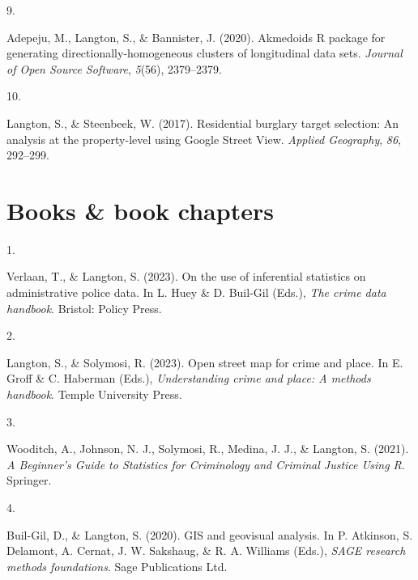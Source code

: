 \documentclass[10pt,a4paper,]{article}
\newlength{\cslhangindent}
\newlength{\csllabelwidth}
\newenvironment{CSLReferences}[2] %
 {\begin{list}{}{%
  \setlength{\itemindent}{0pt}
  \setlength{\leftmargin}{0pt}
  \setlength{\parsep}{0pt}
  \ifodd #1
   \setlength{\leftmargin}{\cslhangindent}
   \setlength{\itemindent}{-1\cslhangindent}
  \fi
  \setlength{\itemsep}{#2\baselineskip}}}
 {\end{list}}
\newcommand{\CSLLeftMargin}[1]{\parbox[t]{\csllabelwidth}{\strut#1\strut}}
\newcommand{\CSLRightInline}[1]{\parbox[t]{\linewidth - \csllabelwidth}{\strut#1\strut}}
\begin{document}
\begin{CSLReferences}{0}{0}
\leavevmode{}%
\CSLLeftMargin{9. }%
\CSLRightInline{Adepeju, M., Langton, S., \& Bannister, J. (2020).
Akmedoids R package for generating directionally-homogeneous clusters of
longitudinal data sets. \emph{Journal of Open Source Software},
\emph{5}(56), 2379--2379.}

\leavevmode{}%
\CSLLeftMargin{10. }%
\CSLRightInline{Langton, S., \& Steenbeek, W. (2017). Residential
burglary target selection: An analysis at the property-level using
Google Street View. \emph{Applied Geography}, \emph{86}, 292--299.}

\end{CSLReferences}

\hypertarget{books-book-chapters}{%
\section{Books \& book chapters}\label{books-book-chapters}}

\hypertarget{refs-43bb75d62a426e63f146b3c7247610e1}{}
\begin{CSLReferences}{0}{0}
\leavevmode{}%
\CSLLeftMargin{1. }%
\CSLRightInline{Verlaan, T., \& Langton, S. (2023). On the use of
inferential statistics on administrative police data. In L. Huey \& D.
Buil-Gil (Eds.), \emph{The crime data handbook}. Bristol: Policy Press.}

\leavevmode{}%
\CSLLeftMargin{2. }%
\CSLRightInline{Langton, S., \& Solymosi, R. (2023). Open street map for
crime and place. In E. Groff \& C. Haberman (Eds.), \emph{Understanding
crime and place: A methods handbook}. Temple University Press.}

\leavevmode{}%
\CSLLeftMargin{3. }%
\CSLRightInline{Wooditch, A., Johnson, N. J., Solymosi, R., Medina, J.
J., \& Langton, S. (2021). \emph{A Beginner's Guide to Statistics for
Criminology and Criminal Justice Using R}. Springer.}

\leavevmode{}%
\CSLLeftMargin{4. }%
\CSLRightInline{Buil-Gil, D., \& Langton, S. (2020). GIS and geovisual
analysis. In P. Atkinson, S. Delamont, A. Cernat, J. W. Sakshaug, \& R.
A. Williams (Eds.), \emph{SAGE research methods foundations}. Sage
Publications Ltd.}

\end{CSLReferences}
\end{document}
